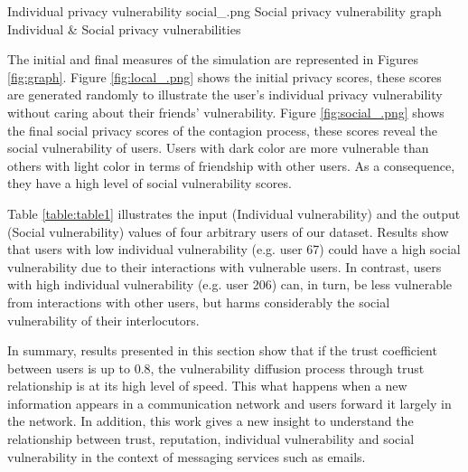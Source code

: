   {Individual privacy vulnerability}
					{social_.png} {Social privacy vulnerability}
					{graph}       {Individual \& Social privacy vulnerabilities}

The initial and final measures of the simulation are represented in Figures \ref{fig:graph}.
Figure \ref{fig:local_.png} shows the initial privacy scores,
	these scores are generated randomly to illustrate the user's individual privacy vulnerability without caring about their friends' vulnerability.
Figure \ref{fig:social_.png} shows the final social privacy scores of the contagion process,
	these scores reveal the social vulnerability of users.
Users with dark color are more vulnerable than others with light color in terms of friendship with other users.
As a consequence,
	they have a high level of social vulnerability scores.


Table \ref{table:table1} illustrates the input (Individual vulnerability) and the output (Social vulnerability) values of four arbitrary users of our dataset.
Results show that users with low individual vulnerability (e.g. user 67) could have a high social vulnerability due to their interactions with vulnerable users.
In contrast,
	users with high individual vulnerability (e.g. user 206) can, in turn, be less vulnerable from interactions with other users,
	but harms considerably the social vulnerability of their interlocutors.

In summary,
	results presented in this section show that if the trust coefficient between users is up to 0.8,
	the vulnerability diffusion process through trust relationship is at its high level of speed.
This what happens when a new information appears in a communication network and users forward it largely in the network.
In addition,
	this work gives a new insight to understand the relationship between trust,
	reputation,
	individual vulnerability and social vulnerability in the context of messaging services such as emails.


